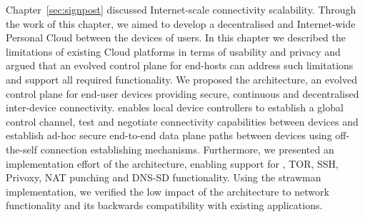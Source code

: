 Chapter~\ref{sec:signpost} discussed Internet-scale connectivity scalability.
Through the work of this chapter, we aimed to develop a decentralised and
Internet-wide Personal Cloud between the devices of users. In this chapter we
described the limitations of existing Cloud platforms in terms of usability and
privacy and argued that an evolved control plane for end-hosts can address such
limitations and support all required functionality.  We proposed the \signpost
architecture, an evolved control plane for end-user devices providing secure,
continuous and decentralised inter-device connectivity. \signpost enables local
device controllers to establish a global control channel, test and negotiate
connectivity capabilities between devices and establish ad-hoc secure end-to-end
data plane paths between devices using off-the-self connection establishing
mechanisms. Furthermore, we presented an implementation effort of the \signpost
architecture, enabling support for \openvpn, TOR, SSH, Privoxy, NAT punching and
DNS-SD functionality. Using the \signpost strawman implementation, we verified 
the low impact of the architecture to network functionality and its
backwards compatibility with existing applications. 


